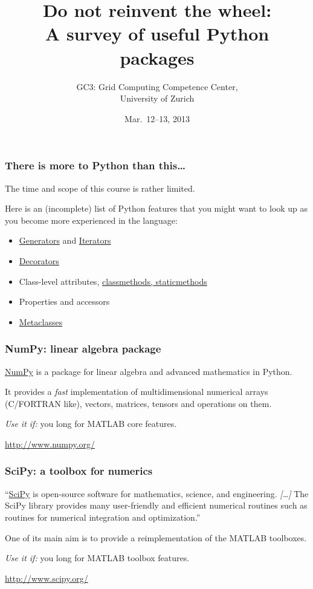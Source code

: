 \documentclass[english,serif,mathserif,xcolor=pdftex,dvipsnames,table]{beamer}
\title[Introduction]{%
  Do not reinvent the wheel:
  \\
  A survey of useful Python packages
}
\author[GC3]{%
  GC3: Grid Computing Competence Center, \\
  University of Zurich
}
\date{Mar.~12--13, 2013}
\begin{document}
\maketitle

\begin{frame}
  \frametitle{There is more to Python than this\ldots}

  The time and scope of this course is rather limited.

  \+
  Here is an (incomplete) list of Python features that you might
  want to look up as you become more experienced in the language:
  \begin{itemize}
  \item
    \href{http://docs.python.org/2/tutorial/classes.html\#generators}{Generators}
    and
    \href{http://docs.python.org/2/tutorial/classes.html\#iterators}{Iterators}
  \item \href{http://www.artima.com/weblogs/viewpost.jsp?thread=240808}{Decorators}
  \item Class-level attributes, \href{http://stackoverflow.com/a/12179752/1808780}{classmethods, staticmethods}
  \item Properties and accessors
  \item \href{http://stackoverflow.com/a/6581949/459543}{Metaclasses}
  \end{itemize}
\end{frame}


\begin{frame}
  \frametitle{NumPy: linear algebra package}

  \href{http://www.numpy.org/}{NumPy} is a package for linear algebra
  and advanced mathematics in Python.

  \+ It provides a \emph{fast} implementation of multidimensional
  numerical arrays (C/FORTRAN like), vectors, matrices, tensors and
  operations on them.

  \+ \emph{Use it if:} you long for MATLAB core features.

  \begin{seealso}
    \url{http://www.numpy.org/}
  \end{seealso}
\end{frame}


\begin{frame}
  \frametitle{SciPy: a toolbox for numerics}

  ``\href{http://www.scipy.org}{SciPy} is open-source software for
  mathematics, science, and engineering. \emph{[\ldots]} The SciPy
  library provides many user-friendly and efficient numerical routines
  such as routines for numerical integration and optimization.''

  \+ One of its main aim is to provide a reimplementation of the
  MATLAB toolboxes.

  \+ \emph{Use it if:} you long for MATLAB toolbox features.

  \begin{seealso}
    \url{http://www.scipy.org/}
  \end{seealso}
\end{frame}
\end{document}
